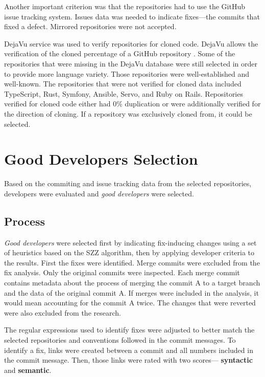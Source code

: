 Another important criterion was that the repositories had to use the GitHub issue tracking system. Issues data was needed to indicate fixes—the commits that fixed a defect. Mirrored repositories were not accepted. \par

DejaVu service was used to verify repositories for cloned code. DejaVu allows the verification of the cloned percentage of a GitHub repository \parencite{dejavu}. Some of the repositories that were missing in the DejaVu database were still selected in order to provide more language variety. Those repositories were well-established and well-known. The repositories that were not verified for cloned data included TypeScript, Rust, Symfony, Ansible, Servo, and Ruby on Rails. Repositories verified for cloned code either had 0\% duplication or were additionally verified for the direction of cloning. If a repository was exclusively cloned from, it could be selected. \par

\section{Good Developers Selection}

Based on the commiting  and issue tracking data from the selected repositories, developers were evaluated and \textit{good developers} were selected.

\subsection{Process}

\textit{Good developers} were selected first by indicating fix-inducing changes using a set of heuristics based on the SZZ algorithm\parencite{Sliwerski}, then by applying developer criteria to the results. First the fixes were identified. Merge commits were excluded from the fix analysis. Only the original commits were inspected. Each merge commit contains metadata about the process of merging the commit A to a target branch and the data of the original commit A. If merges were included in the analysis, it would mean accounting for the commit A twice. The changes that were reverted were also excluded from the research. \par

The regular expressions used to identify fixes were adjusted to better match the selected repositories and conventions followed in the commit messages. To identify a fix, links were created between a commit and all numbers included in the commit message. Then, those links were rated with two scores— \textbf{syntactic} and \textbf{semantic}. \par

